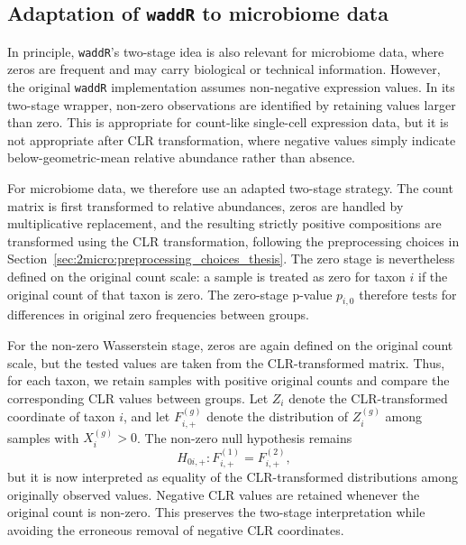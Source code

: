 \subsection{Adaptation of \texttt{waddR} to microbiome data}
\label{sec:4feature:diffdist_waddr_microbiome}

In principle, \texttt{waddR}'s two-stage idea is also relevant for microbiome data, where zeros are frequent and may carry biological or technical information. However, the original \texttt{waddR} implementation assumes non-negative expression values. In its two-stage wrapper, non-zero observations are identified by retaining values larger than zero. This is appropriate for count-like single-cell expression data, but it is not appropriate after CLR transformation, where negative values simply indicate below-geometric-mean relative abundance rather than absence.

For microbiome data, we therefore use an adapted two-stage strategy. The count matrix is first transformed to relative abundances, zeros are handled by multiplicative replacement, and the resulting strictly positive compositions are transformed using the CLR transformation, following the preprocessing choices in Section~\ref{sec:2micro:preprocessing_choices_thesis}. The zero stage is nevertheless defined on the original count scale: a sample is treated as zero for taxon $i$ if the original count of that taxon is zero. The zero-stage p-value $p_{i,0}$ therefore tests for differences in original zero frequencies between groups.

For the non-zero Wasserstein stage, zeros are again defined on the original count scale, but the tested values are taken from the CLR-transformed matrix. Thus, for each taxon, we retain samples with positive original counts and compare the corresponding CLR values between groups. Let $Z_i$ denote the CLR-transformed coordinate of taxon $i$, and let $F_{i,+}^{(g)}$ denote the distribution of $Z_i^{(g)}$ among samples with $X_i^{(g)} > 0$. The non-zero null hypothesis remains
\begin{equation}
H_{0i,+}: F_{i,+}^{(1)} = F_{i,+}^{(2)},
\end{equation}
but it is now interpreted as equality of the CLR-transformed distributions among originally observed values. Negative CLR values are retained whenever the original count is non-zero. This preserves the two-stage interpretation while avoiding the erroneous removal of negative CLR coordinates.


